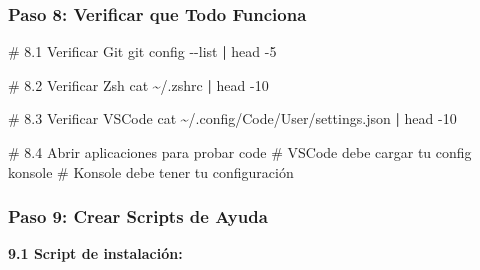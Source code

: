 \documentclass[
  doc,
  floatsintext,
  longtable,
  a4paper,
  nolmodern,
  notxfonts,
  notimes,
  12pt,
  colorlinks=true,linkcolor=blue,citecolor=blue,urlcolor=blue]{apa7}
\newenvironment{Shaded}{\begin{snugshade}}{\end{snugshade}}
\newcommand{\AttributeTok}[1]{\textcolor[rgb]{0.40,0.45,0.13}{#1}}
\newcommand{\CommentTok}[1]{\textcolor[rgb]{0.37,0.37,0.37}{#1}}
\newcommand{\ExtensionTok}[1]{\textcolor[rgb]{0.00,0.23,0.31}{#1}}
\newcommand{\FunctionTok}[1]{\textcolor[rgb]{0.28,0.35,0.67}{#1}}
\newcommand{\KeywordTok}[1]{\textcolor[rgb]{0.00,0.23,0.31}{\textbf{#1}}}
\newcommand{\NormalTok}[1]{\textcolor[rgb]{0.00,0.23,0.31}{#1}}
\newcommand{\OperatorTok}[1]{\textcolor[rgb]{0.37,0.37,0.37}{#1}}
\newcommand{\StringTok}[1]{\textcolor[rgb]{0.13,0.47,0.30}{#1}}
\begin{document}
\subsubsection{Paso 8: Verificar que Todo
Funciona}\label{paso-8-verificar-que-todo-funciona}

\begin{Shaded}
\begin{Highlighting}[]
\CommentTok{\# 8.1 Verificar Git}
\FunctionTok{git}\NormalTok{ config }\AttributeTok{{-}{-}list} \KeywordTok{|} \FunctionTok{head} \AttributeTok{{-}5}

\CommentTok{\# 8.2 Verificar Zsh}
\FunctionTok{cat}\NormalTok{ \textasciitilde{}/.zshrc }\KeywordTok{|} \FunctionTok{head} \AttributeTok{{-}10}

\CommentTok{\# 8.3 Verificar VSCode}
\FunctionTok{cat}\NormalTok{ \textasciitilde{}/.config/Code/User/settings.json }\KeywordTok{|} \FunctionTok{head} \AttributeTok{{-}10}

\CommentTok{\# 8.4 Abrir aplicaciones para probar}
\ExtensionTok{code}  \CommentTok{\# VSCode debe cargar tu config}
\ExtensionTok{konsole}  \CommentTok{\# Konsole debe tener tu configuración}
\end{Highlighting}
\end{Shaded}

\subsubsection{Paso 9: Crear Scripts de
Ayuda}\label{paso-9-crear-scripts-de-ayuda}

\textbf{9.1 Script de instalación:}

\begin{Shaded}
\end{Shaded}
\end{document}
